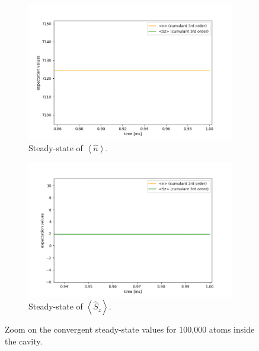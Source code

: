 \documentclass[11pt]{report}
\begin{document}
\begin{figure}[h!]
\centering
\begin{subfigure}{.48\textwidth}
  \centering
  \includegraphics[width=1\linewidth]{100k_3_nsz_zoom_3}
  \caption{Steady-state of $\left\langle \hat{n} \right\rangle$.}
\end{subfigure}%
\hspace{1em}%
\begin{subfigure}{.48\textwidth}
  \centering
  \includegraphics[width=1\linewidth]{100k_3_nsz_zoom_2}
  \caption{Steady-state of $\left\langle \hat{S}_z \right\rangle$.}
\end{subfigure}
\caption{Zoom on the convergent steady-state values for 100,000 atoms inside the cavity.}
\end{figure}
\end{document}
